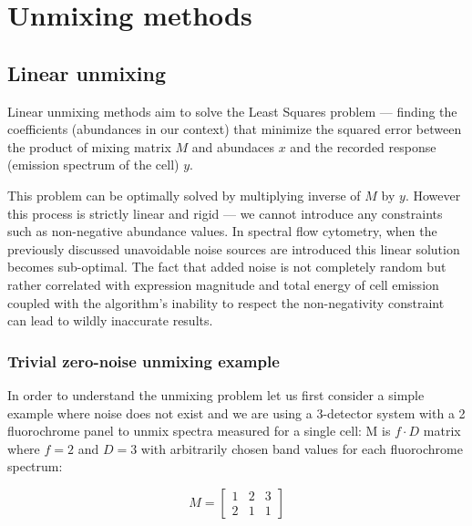 \chapter{Unmixing methods}
\label{chap:math}
\section{Linear unmixing}
Linear unmixing methods aim to solve the Least Squares problem --- finding the coefficients (abundances in our context) that minimize the squared error between the product of mixing matrix $M$ and abundaces $x$ and the recorded response (emission spectrum of the cell) $y$.

This problem can be optimally solved by multiplying inverse of $M$ by $y$. However this process is strictly linear and rigid --- we cannot introduce any constraints such as non-negative abundance values. 
In spectral flow cytometry, when the previously discussed unavoidable noise sources are introduced this linear solution becomes sub-optimal.
The fact that added noise is not completely random but rather correlated with expression magnitude and total energy of cell emission coupled with the algorithm's inability to respect the non-negativity constraint can lead to wildly inaccurate results. 

\subsection{Trivial zero-noise unmixing example} \label{Unmixing example}
In order to understand the unmixing problem let us first consider a simple example where noise does not exist and we are using a 3-detector system with a 2 fluorochrome panel to unmix spectra measured for a single cell:
M is $f \cdot D$ matrix where $f=2$ and $D=3$ with arbitrarily chosen band values for each fluorochrome spectrum:

\[
M=\begin{bmatrix}
1 & 2 & 3\\
2 & 1 & 1
\end{bmatrix}
\]

